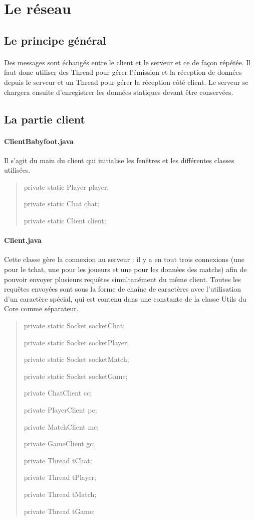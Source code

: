 \documentclass[a4paper,12pt]{report}
\begin{document}
\section{Le réseau}
\subsection{Le principe général}
\paragraph{}
Des messages sont échangés entre le client et le serveur et ce de façon répétée. Il faut donc utiliser des Thread pour gérer l'émission et la réception de données depuis le serveur et un Thread pour gérer la réception côté client. Le serveur se chargera ensuite d'enregistrer les données statiques devant être conservées.
\subsection{La partie client}
\paragraph{ClientBabyfoot.java}
Il s'agit du main du client qui initialise les fenêtres et les différentes classes utilisées.
\begin{quote}
	private static Player player;
    
	private static Chat chat;
    
	private static Client client;
\end{quote}
\paragraph{Client.java}
Cette classe gère la connexion au serveur : il y a en tout trois connexions (une pour le tchat, une pour les joueurs et une pour les données des matchs) afin de pouvoir envoyer plusieurs requêtes simultanément du même client. Toutes les requêtes envoyées sont sous la forme de chaîne de caractères avec l'utilisation d'un caractère spécial, qui est contenu dans une constante de la classe Utils du Core comme séparateur.
\begin{quote}
	private static Socket socketChat;
	
	private static Socket socketPlayer;
	
	private static Socket socketMatch;
	
	private static Socket socketGame;
	
	private ChatClient cc;
	
	private PlayerClient pc;
	
	private MatchClient mc;
	
	private GameClient gc;
	
	private Thread tChat;
	
	private Thread tPlayer;
	
	private Thread tMatch;
	
	private Thread tGame;
\end{quote}
\end{document}
